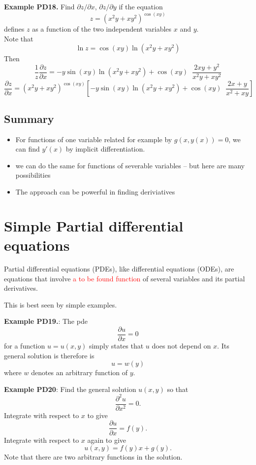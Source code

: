 \documentclass{article}
\newcommand{\pd}{\partial}
\begin{document}
\textbf{Example PD18.}  Find $\partial z/\partial x$, $\partial
z/\partial y $  if the equation
$$
z=(x^2y+xy^2)^{\cos(xy)}
$$
defines $z$ as a function of the two independent variables $x$ and
$y$.\\

Note that
$$
\ln z=\cos(xy) \ln (x^2y+xy^2)
$$
Then
$$
\frac{1}{ z} \frac{\pd z}{\pd x} =-y \sin (xy) \ln (x^2y+xy^2)+
\cos(xy)  \;\;\frac{2xy+y^2}{x^2y+xy^2}
$$
$$
 \frac{\partial z}{\partial x} =  (x^2y+xy^2)^{\cos(xy)} \left[
-y \sin (xy) \ln (x^2y+xy^2)+ \cos(xy) \;\;\frac{2x+y}{x^2+xy}
\right]
$$


\subsection{Summary}

\begin{itemize}
\item
For functions of one variable related for example by $g(x, y(x)) = 0$, we can find $y' (x)$ by implicit differentiation.
\item we can do the same for functions of severable variables -- but here are many possibilities
\item
The approach can be powerful in finding deriviatives
\end{itemize}


\section{Simple Partial differential equations }

Partial differential equations (PDEs), like differential equations (ODEs), are
equations that involve \textcolor{red}{a to be found function} of several variables 
and its partial derivatives. 

This is best seen by simple examples.



\textbf{Example PD19.}:  The pde
$$
\frac{\partial u}{\partial x} =0
$$
for a function $u=u(x,y)$ simply states that $u$ does not depend on $x$. Its general solution is
therefore is
$$
u=w(y)
$$
where $w$ denotes an arbitrary function of $y$.


\textbf{Example PD20}: Find the general solution $u(x,y)$ so that
\begin{equation}\label{e1.2b}
\frac{\partial^2 u}{\partial x^2}= 0.
\end{equation}
Integrate with respect to $x$ to give
$$
\frac{\partial u}{\partial x}=f(y).
$$
Integrate with respect to $x$ again to give
$$
u(x,y)=f(y) x +g(y).
$$
Note that there are two arbitrary functions in the solution.
\end{document}
